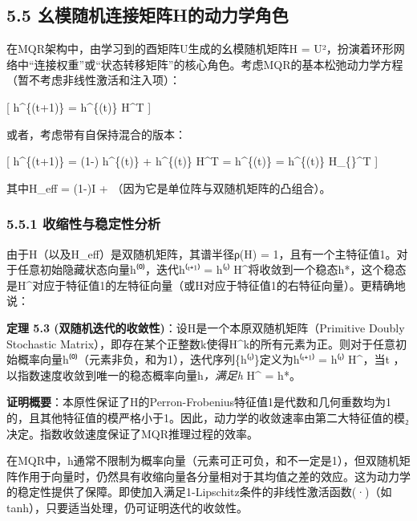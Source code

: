 \documentclass[
  12pt,
]{article}
\begin{document}
\hypertarget{ux5e7aux6a21ux968fux673aux8fdeux63a5ux77e9ux9635hux7684ux52a8ux529bux5b66ux89d2ux8272}{%
\subsection{5.5
幺模随机连接矩阵H的动力学角色}\label{ux5e7aux6a21ux968fux673aux8fdeux63a5ux77e9ux9635hux7684ux52a8ux529bux5b66ux89d2ux8272}}

在MQR架构中，由学习到的酉矩阵U生成的幺模随机矩阵H =
\textbar U\textbar²，扮演着环形网络中``连接权重''或``状态转移矩阵''的核心角色。考虑MQR的基本松弛动力学方程（暂不考虑非线性激活和注入项）：

{[} h\^{}\{(t+1)\} = h\^{}\{(t)\} H\^{}T {]}

或者，考虑带有自保持混合的版本：

{[} h\^{}\{(t+1)\} = (1-\beta) h\^{}\{(t)\} + \beta h\^{}\{(t)\} H\^{}T
= h\^{}\{(t)\}  = h\^{}\{(t)\}
H\_\{\}\^{}T {]}

其中H\_eff = (1-\beta)I +
（因为它是单位阵与双随机矩阵的凸组合）。

\hypertarget{ux6536ux7f29ux6027ux4e0eux7a33ux5b9aux6027ux5206ux6790}{%
\subsubsection{5.5.1
收缩性与稳定性分析}\label{ux6536ux7f29ux6027ux4e0eux7a33ux5b9aux6027ux5206ux6790}}

由于H（以及H\_eff）是双随机矩阵，其谱半径ρ(H) =
1，且有一个主特征值1。对于任意初始隐藏状态向量h⁽⁰⁾，迭代h⁽ᵗ⁺¹⁾ = h⁽ᵗ⁾
H^{}将收敛到一个稳态h*，这个稳态是H^{}对应于特征值1的左特征向量（或H对应于特征值1的右特征向量）。更精确地说：

\textbf{定理 5.3
(双随机迭代的收敛性)}：设H是一个本原双随机矩阵（Primitive Doubly
Stochastic
Matrix），即存在某个正整数k使得H\^{}k的所有元素为正。则对于任意初始概率向量h⁽⁰⁾（元素非负，和为1），迭代序列\{h⁽ᵗ⁾\}定义为h⁽ᵗ⁺¹⁾
= h⁽ᵗ⁾ H^{}，当t \rightarrow {}，以指数速度收敛到唯一的稳态概率向量h\emph{，满足h}
H^{} = h*。

\textbf{证明概要}：本原性保证了H的Perron-Frobenius特征值1是代数和几何重数均为1的，且其他特征值的模严格小于1。因此，动力学的收敛速率由第二大特征值的模\textbar \lambda₂\textbar 决定。指数收敛速度保证了MQR推理过程的效率。

在MQR中，h通常不限制为概率向量（元素可正可负，和不一定是1），但双随机矩阵作用于向量时，仍然具有收缩向量各分量相对于其均值之差的效应。这为动力学的稳定性提供了保障。即使加入满足1-Lipschitz条件的非线性激活函数\sigma(·)（如tanh），只要适当处理，仍可证明迭代的收敛性。
\end{document}
